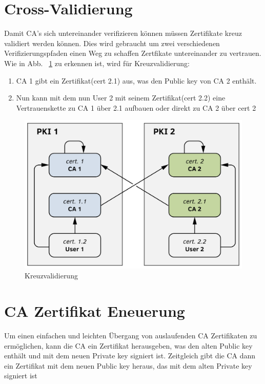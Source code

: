   \section{Cross-Validierung}
  Damit CA's sich untereinander verifizieren können müssen Zertifikate kreuz
  validiert werden können. Dies wird gebraucht um zwei verschiedenen
  Verifizierungspfaden einen Weg zu schaffen Zertfikate untereinander zu
  vertrauen. Wie in Abb. ~\ref{fig:crossver} zu erkennen ist, wird für
  Kreuzvalidierung:
  \begin{enumerate}
  \item CA 1 gibt ein Zertifikat(cert 2.1) aus, was den Public key von CA 2 enthält.
  \item Nun kann mit dem nun User 2 mit seinem Zertifikat(cert 2.2) eine Vertrauenskette
    zu CA 1 über 2.1 aufbauen oder direkt zu CA 2 über cert 2
  \end{enumerate}


  \begin{figure}[!htb]
    \center \includegraphics[scale=0.28]{images/ccd.png}
    \caption{Kreuzvalidierung}
    \label{fig:crossver}
  \end{figure}

  \section{CA Zertifikat Eneuerung}
  Um einen einfachen und leichten Übergang von auslaufenden CA Zertifikaten zu
  ermöglichen, kann die CA ein Zertifikat herausgeben, was den alten
  Public key enthält und mit dem neuen Private key signiert ist. Zeitgleich gibt
  die CA dann ein Zertifikat mit dem neuen Public key heraus, das mit dem alten
  Private key signiert ist